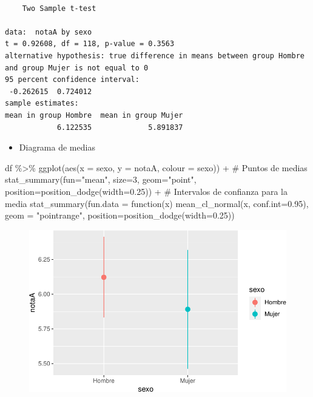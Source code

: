 \documentclass[
  a4paper,
]{scrreport}
\newenvironment{Shaded}{\begin{snugshade}}{\end{snugshade}}
\newcommand{\AttributeTok}[1]{\textcolor[rgb]{0.40,0.45,0.13}{#1}}
\newcommand{\CommentTok}[1]{\textcolor[rgb]{0.37,0.37,0.37}{#1}}
\newcommand{\ControlFlowTok}[1]{\textcolor[rgb]{0.00,0.23,0.31}{#1}}
\newcommand{\DecValTok}[1]{\textcolor[rgb]{0.68,0.00,0.00}{#1}}
\newcommand{\FloatTok}[1]{\textcolor[rgb]{0.68,0.00,0.00}{#1}}
\newcommand{\FunctionTok}[1]{\textcolor[rgb]{0.28,0.35,0.67}{#1}}
\newcommand{\NormalTok}[1]{\textcolor[rgb]{0.00,0.23,0.31}{#1}}
\newcommand{\SpecialCharTok}[1]{\textcolor[rgb]{0.37,0.37,0.37}{#1}}
\newcommand{\StringTok}[1]{\textcolor[rgb]{0.13,0.47,0.30}{#1}}
\providecommand{\tightlist}{%
  \setlength{\itemsep}{0pt}\setlength{\parskip}{0pt}}\usepackage{longtable,booktabs,array}
\theoremstyle{definition}
\theoremstyle{definition}
\theoremstyle{remark}
\begin{document}
\begin{verbatim}

    Two Sample t-test

data:  notaA by sexo
t = 0.92608, df = 118, p-value = 0.3563
alternative hypothesis: true difference in means between group Hombre and group Mujer is not equal to 0
95 percent confidence interval:
 -0.262615  0.724012
sample estimates:
mean in group Hombre  mean in group Mujer 
            6.122535             5.891837 
\end{verbatim}

\begin{itemize}
\tightlist
\item
  Diagrama de medias
\end{itemize}

\begin{Shaded}
\begin{Highlighting}[]
\NormalTok{df }\SpecialCharTok{\%\textgreater{}\%} \FunctionTok{ggplot}\NormalTok{(}\FunctionTok{aes}\NormalTok{(}\AttributeTok{x =}\NormalTok{ sexo, }\AttributeTok{y =}\NormalTok{ notaA, }\AttributeTok{colour =}\NormalTok{ sexo)) }\SpecialCharTok{+} 
  \CommentTok{\# Puntos de medias}
  \FunctionTok{stat\_summary}\NormalTok{(}\AttributeTok{fun=}\StringTok{"mean"}\NormalTok{, }\AttributeTok{size=}\DecValTok{3}\NormalTok{,  }\AttributeTok{geom=}\StringTok{"point"}\NormalTok{, }\AttributeTok{position=}\FunctionTok{position\_dodge}\NormalTok{(}\AttributeTok{width=}\FloatTok{0.25}\NormalTok{)) }\SpecialCharTok{+} 
  \CommentTok{\# Intervalos de confianza para la media}
  \FunctionTok{stat\_summary}\NormalTok{(}\AttributeTok{fun.data =} \ControlFlowTok{function}\NormalTok{(x) }\FunctionTok{mean\_cl\_normal}\NormalTok{(x, }\AttributeTok{conf.int=}\FloatTok{0.95}\NormalTok{), }\AttributeTok{geom =} \StringTok{"pointrange"}\NormalTok{, }\AttributeTok{position=}\FunctionTok{position\_dodge}\NormalTok{(}\AttributeTok{width=}\FloatTok{0.25}\NormalTok{)) }
\end{Highlighting}
\end{Shaded}

\begin{figure}[H]

{\centering \includegraphics{08-analisis-estadisticos_files/figure-pdf/unnamed-chunk-35-1.pdf}

}

\end{figure}
\end{document}
